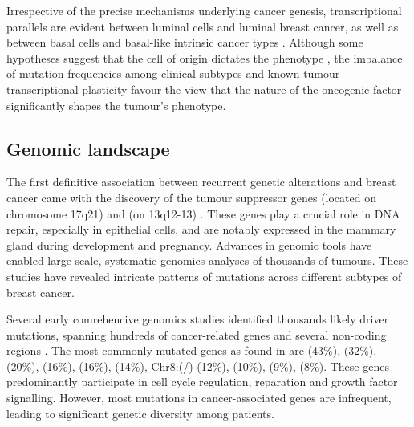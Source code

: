 Irrespective of the precise mechanisms underlying cancer genesis, transcriptional parallels are evident between luminal cells and luminal breast cancer, as well as between basal cells and basal-like intrinsic cancer types \parencite{Bhat-Nakshatri2021-jy}. Although some hypotheses suggest that the cell of origin dictates the phenotype \parencite{Skibinski2015-rh, Taurin2020-mq}, the imbalance of mutation frequencies among clinical subtypes \parencite{Cancer_Genome_Atlas_Network2012-gx,Russnes2017-eo} and known tumour transcriptional plasticity \parencite{Fan2020-vi, Su2015-ve,Yamamoto2014-th,Hein2016-lv} favour the view that the nature of the oncogenic factor significantly shapes the tumour's phenotype.

\subsection{Genomic landscape} 

The first definitive association between recurrent genetic alterations and breast cancer came with the discovery of the tumour suppressor genes  (located on chromosome 17q21) and  (on 13q12-13) \parencite{Wooster1994-xa, Hall1990-mg}. These genes play a crucial role in DNA repair, especially in epithelial cells, and are notably expressed in the mammary gland during development and pregnancy. Advances in genomic tools have enabled large-scale, systematic genomics analyses of thousands of tumours. These studies have revealed intricate patterns of mutations across different subtypes of breast cancer.


Several early comrehencive genomics studies identified thousands likely driver mutations, spanning hundreds of cancer-related genes and several non-coding regions \parencite{Shah2009-xz, Cancer_Genome_Atlas_Network2012-gx,Shah2012-xz, Nik-Zainal2016-ek,Banerji2012-as,Ciriello2015-ey,Pereira2016-ov, Curtis2012-hu}. The most commonly mutated genes as found in \textcite{Cancer_Genome_Atlas_Network2012-gx} are  (43\%),  (32\%),  (20\%),  (16\%),  (16\%),  (14\%), Chr8:(/) (12\%),  (10\%),  (9\%),  (8\%). These genes predominantly participate in cell cycle regulation, reparation and growth factor signalling. However, most mutations in cancer-associated genes are infrequent, leading to significant genetic diversity among patients.

